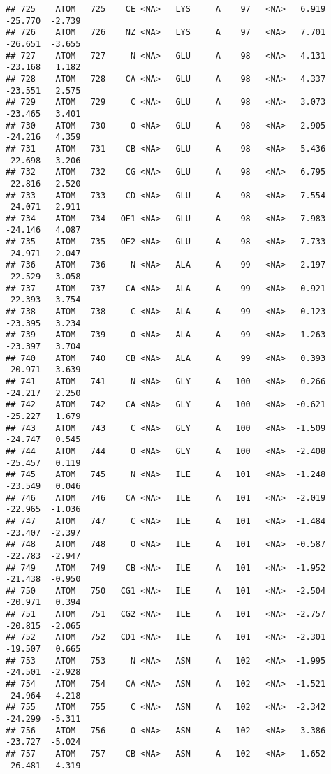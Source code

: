 \documentclass[
]{article}
\begin{document}
\begin{verbatim}
## 725    ATOM   725    CE <NA>   LYS     A    97   <NA>   6.919 -25.770  -2.739
## 726    ATOM   726    NZ <NA>   LYS     A    97   <NA>   7.701 -26.651  -3.655
## 727    ATOM   727     N <NA>   GLU     A    98   <NA>   4.131 -23.168   1.182
## 728    ATOM   728    CA <NA>   GLU     A    98   <NA>   4.337 -23.551   2.575
## 729    ATOM   729     C <NA>   GLU     A    98   <NA>   3.073 -23.465   3.401
## 730    ATOM   730     O <NA>   GLU     A    98   <NA>   2.905 -24.216   4.359
## 731    ATOM   731    CB <NA>   GLU     A    98   <NA>   5.436 -22.698   3.206
## 732    ATOM   732    CG <NA>   GLU     A    98   <NA>   6.795 -22.816   2.520
## 733    ATOM   733    CD <NA>   GLU     A    98   <NA>   7.554 -24.071   2.911
## 734    ATOM   734   OE1 <NA>   GLU     A    98   <NA>   7.983 -24.146   4.087
## 735    ATOM   735   OE2 <NA>   GLU     A    98   <NA>   7.733 -24.971   2.047
## 736    ATOM   736     N <NA>   ALA     A    99   <NA>   2.197 -22.529   3.058
## 737    ATOM   737    CA <NA>   ALA     A    99   <NA>   0.921 -22.393   3.754
## 738    ATOM   738     C <NA>   ALA     A    99   <NA>  -0.123 -23.395   3.234
## 739    ATOM   739     O <NA>   ALA     A    99   <NA>  -1.263 -23.397   3.704
## 740    ATOM   740    CB <NA>   ALA     A    99   <NA>   0.393 -20.971   3.639
## 741    ATOM   741     N <NA>   GLY     A   100   <NA>   0.266 -24.217   2.250
## 742    ATOM   742    CA <NA>   GLY     A   100   <NA>  -0.621 -25.227   1.679
## 743    ATOM   743     C <NA>   GLY     A   100   <NA>  -1.509 -24.747   0.545
## 744    ATOM   744     O <NA>   GLY     A   100   <NA>  -2.408 -25.457   0.119
## 745    ATOM   745     N <NA>   ILE     A   101   <NA>  -1.248 -23.549   0.046
## 746    ATOM   746    CA <NA>   ILE     A   101   <NA>  -2.019 -22.965  -1.036
## 747    ATOM   747     C <NA>   ILE     A   101   <NA>  -1.484 -23.407  -2.397
## 748    ATOM   748     O <NA>   ILE     A   101   <NA>  -0.587 -22.783  -2.947
## 749    ATOM   749    CB <NA>   ILE     A   101   <NA>  -1.952 -21.438  -0.950
## 750    ATOM   750   CG1 <NA>   ILE     A   101   <NA>  -2.504 -20.971   0.394
## 751    ATOM   751   CG2 <NA>   ILE     A   101   <NA>  -2.757 -20.815  -2.065
## 752    ATOM   752   CD1 <NA>   ILE     A   101   <NA>  -2.301 -19.507   0.665
## 753    ATOM   753     N <NA>   ASN     A   102   <NA>  -1.995 -24.501  -2.928
## 754    ATOM   754    CA <NA>   ASN     A   102   <NA>  -1.521 -24.964  -4.218
## 755    ATOM   755     C <NA>   ASN     A   102   <NA>  -2.342 -24.299  -5.311
## 756    ATOM   756     O <NA>   ASN     A   102   <NA>  -3.386 -23.727  -5.024
## 757    ATOM   757    CB <NA>   ASN     A   102   <NA>  -1.652 -26.481  -4.319

\end{verbatim}
\end{document}
